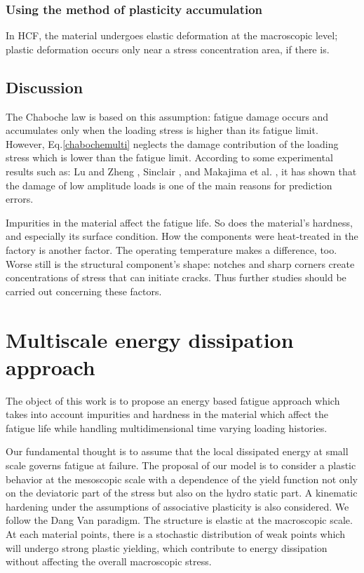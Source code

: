 \documentclass[3p,times,procedia,number]{elsarticle}
\begin{document}
\subsubsection{Using the method of plasticity accumulation}

In HCF, the material undergoes elastic deformation at the macroscopic level; plastic deformation occurs only near a stress concentration area, if there is.

\subsection{Discussion}

The Chaboche law is based on this assumption: fatigue damage occurs and accumulates only when the loading stress is higher than its fatigue limit. However, Eq.\eqref{chabochemulti} neglects the damage contribution of the loading stress which is lower than the fatigue
limit. According to some experimental results such as: Lu
and Zheng \cite{xi2008strengthening} \cite{xi2009strengthening} \cite{xi2009changes}, Sinclair \cite{sinclair1952investigation}, and Makajima et al. \cite{nakajima2007coaxing},
it has shown that the damage of low amplitude loads is one
of the main reasons for prediction errors. 

Impurities in the material affect the fatigue life. So does the material's hardness, and especially its surface condition. How the components were heat-treated in the factory is another factor. The operating temperature makes a difference, too. Worse still is the structural component's shape: notches and sharp corners create concentrations of stress that can initiate cracks. Thus further studies should be carried out concerning these factors.

\section{Multiscale energy dissipation approach}
The object of this work is to propose an energy based fatigue approach which takes into account impurities and hardness in the material which affect the fatigue life while handling multidimensional time varying loading histories.

Our fundamental thought is to assume that the local dissipated energy at small scale governs fatigue at failure. The proposal of our model is to consider a plastic behavior at the mesoscopic scale with a dependence of the yield function not only on the deviatoric part of the stress but also on the hydro static part. A kinematic hardening under the assumptions of associative plasticity is also considered. We follow the Dang Van paradigm. The structure is elastic at the macroscopic scale. At each material points, there is a stochastic distribution of weak points which will undergo strong plastic yielding, which contribute to energy dissipation without affecting the overall macroscopic stress.
\end{document}
